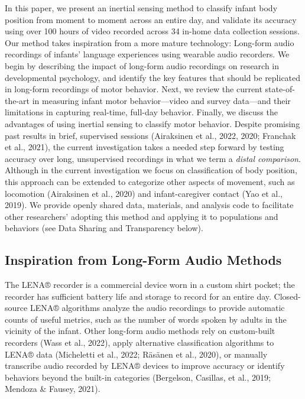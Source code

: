 \documentclass[
  man]{apa6}
\begin{document}
In this paper, we present an inertial sensing method to classify infant body position from moment to moment across an entire day, and validate its accuracy using over 100 hours of video recorded across 34 in-home data collection sessions. Our method takes inspiration from a more mature technology: Long-form audio recordings of infants' language experiences using wearable audio recorders. We begin by describing the impact of long-form audio recordings on research in developmental psychology, and identify the key features that should be replicated in long-form recordings of motor behavior. Next, we review the current state-of-the-art in measuring infant motor behavior---video and survey data---and their limitations in capturing real-time, full-day behavior. Finally, we discuss the advantages of using inertial sensing to classify motor behavior. Despite promising past results in brief, supervised sessions (Airaksinen et al., 2022, 2020; Franchak et al., 2021), the current investigation takes a needed step forward by testing accuracy over long, unsupervised recordings in what we term a \emph{distal comparison}. Although in the current investigation we focus on classification of body position, this approach can be extended to categorize other aspects of movement, such as locomotion (Airaksinen et al., 2020) and infant-caregiver contact (Yao et al., 2019). We provide openly shared data, materials, and analysis code to facilitate other researchers' adopting this method and applying it to populations and behaviors (see Data Sharing and Transparency below).

\hypertarget{inspiration-from-long-form-audio-methods}{%
\subsection{Inspiration from Long-Form Audio Methods}\label{inspiration-from-long-form-audio-methods}}

The LENA® recorder is a commercial device worn in a custom shirt pocket; the recorder has sufficient battery life and storage to record for an entire day. Closed-source LENA® algorithms analyze the audio recordings to provide automatic counts of useful metrics, such as the number of words spoken by adults in the vicinity of the infant. Other long-form audio methods rely on custom-built recorders (Wass et al., 2022), apply alternative classification algorithms to LENA® data (Micheletti et al., 2022; Räsänen et al., 2020), or manually transcribe audio recorded by LENA® devices to improve accuracy or identify behaviors beyond the built-in categories (Bergelson, Casillas, et al., 2019; Mendoza \& Fausey, 2021).
\end{document}
